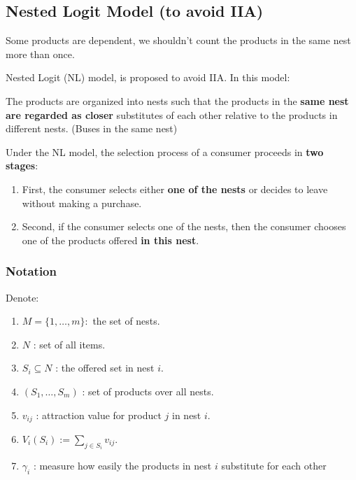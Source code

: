 \documentclass[11pt,a4paper]{article}
\begin{document}
\subsection{Nested Logit Model (to avoid IIA)}
Some products are dependent, we shouldn't count the products in the same nest more than once.

Nested Logit (NL) model, is proposed to avoid IIA. In this model:

The products are organized into nests such that the products in the \textbf{same nest are regarded as closer} substitutes of each other relative to the products in different nests. (Buses in the same nest)

Under the NL model, the selection process of a consumer proceeds in \textbf{two stages}:
\begin{enumerate}[$\bullet$]
    \item First, the consumer selects either \textbf{one of the nests} or decides to leave without making a purchase.
    \item Second, if the consumer selects one of the nests, then the consumer chooses one of the products offered \textbf{in this nest}.
\end{enumerate}
\subsubsection{Notation}
Denote:
\begin{enumerate}[$\bullet$]
    \item $M=\{1, \ldots, m\}:$ the set of nests.
    \item $N$ : set of all items.
    \item $S_{i} \subseteq N$ : the offered set in nest $i$.
    \item $\left(S_{1}, \ldots, S_{m}\right)$ : set of products over all nests.
    \item $v_{i j}$ : attraction value for product $j$ in nest $i$.
    \item $V_{i}\left(S_{i}\right):=\sum_{j \in S_{i}} v_{i j}$.
    \item $\gamma_{i}$ : measure how easily the products in nest $i$ substitute for each other
\end{enumerate}
\end{document}
